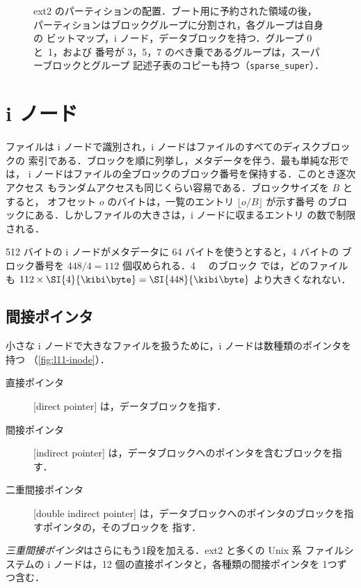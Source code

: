\documentclass[../main.tex]{subfiles}
\begin{document}
\begin{figure}[htbp]
  \centering
  
  \caption{ext2 のパーティションの配置．ブート用に予約された領域の後，
    パーティションはブロックグループに分割され，各グループは自身の
    ビットマップ，i ノード，データブロックを持つ．グループ 0 と~1，および
    番号が 3，5，7 のべき乗であるグループは，スーパーブロックとグループ
    記述子表のコピーも持つ（\texttt{sparse\_super}）．}
  \label{fig:l11-ext2}
\end{figure}

\section{i ノード}
\label{sec:l11-inodes}

ファイルは i ノードで識別され，i ノードはファイルのすべてのディスクブロックの
索引である．ブロックを順に列挙し，メタデータを伴う．最も単純な形では，
i ノードはファイルの全ブロックのブロック番号を保持する．このとき逐次アクセス
もランダムアクセスも同じくらい容易である．ブロックサイズを $B$ とすると，
オフセット $o$ のバイトは，一覧のエントリ $\lfloor o/B \rfloor$ が示す番号
のブロックにある．しかしファイルの大きさは，i ノードに収まるエントリ
の数で制限される．

\begin{example}
  512 バイトの i ノードがメタデータに 64 バイトを使うとすると，4 バイトの
  ブロック番号を $448/4 = 112$ 個収められる．\SI{4}{\kibi\byte} のブロック
  では，どのファイルも $112 \times \SI{4}{\kibi\byte} = \SI{448}{\kibi\byte}$
  より大きくなれない．
\end{example}

\subsection{間接ポインタ}

小さな i ノードで大きなファイルを扱うために，i ノードは数種類のポインタを持つ
（\cref{fig:l11-inode}）．
\begin{description}
  \item[直接ポインタ] [direct pointer]
    は，データブロックを指す．
  \item[間接ポインタ] [indirect pointer]
    は，データブロックへのポインタを含むブロックを指す．
  \item[二重間接ポインタ]
    [double indirect pointer]
    は，データブロックへのポインタのブロックを指すポインタの，そのブロックを
    指す．
\end{description}
\emph{三重間接ポインタ}はさらにもう1段を加える．ext2 と多くの Unix 系
ファイルシステムの i ノードは，12 個の直接ポインタと，各種類の間接ポインタを
1つずつ含む．
\end{document}
